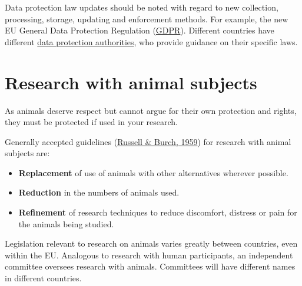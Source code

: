 \documentclass[
]{book}
\begin{document}
Data protection law updates should be noted with regard to new collection, processing, storage, updating and enforcement methods. For example, the new EU General Data Protection Regulation (\href{https://gdpr.eu/what-is-gdpr/}{GDPR}). Different countries have different \href{https://en.wikipedia.org/wiki/National_data_protection_authority}{data protection authorities}, who provide guidance on their specific laws.

\hypertarget{research-with-animal-subjects}{%
\section{Research with animal subjects}\label{research-with-animal-subjects}}

As animals deserve respect but cannot argue for their own protection and rights, they must be protected if used in your research.

Generally accepted guidelines (\href{http://117.239.25.194:7000/jspui/bitstream/123456789/1342/1/PRILIMINERY\%20\%20AND\%20\%20CONTENTS.pdf}{Russell \& Burch, 1959}) for research with animal subjects are:

\begin{itemize}
\item
  \textbf{Replacement} of use of animals with other alternatives wherever possible.
\item
  \textbf{Reduction} in the numbers of animals used.
\item
  \textbf{Refinement} of research techniques to reduce discomfort, distress or pain for the animals being studied.
\end{itemize}

Legislation relevant to research on animals varies greatly between countries, even within the EU. Analogous to research with human participants, an independent committee oversees research with animals. Committees will have different names in different countries.
\end{document}
